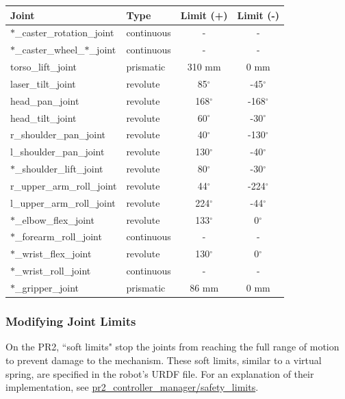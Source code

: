 \begin{tabular}{ll*{2}{c}}
Joint  & Type  & Limit (+) & Limit (-) \\
\hline \hline
$\ast$\_caster\_rotation\_joint        & continuous & -            & - \\
$\ast$\_caster\_wheel\_$\ast$\_joint   & continuous & -            & - \\
torso\_lift\_joint                     & prismatic  & 310 mm       & 0 mm \\
laser\_tilt\_joint                     & revolute   & 85$^\circ$   & -45$^\circ$ \\
head\_pan\_joint                       & revolute   & 168$^\circ$  & -168$^\circ$  \\
head\_tilt\_joint                      & revolute   & 60$^\circ$   & -30$^\circ$  \\
r\_shoulder\_pan\_joint                 & revolute   & 40$^\circ$   & -130$^\circ$  \\
l\_shoulder\_pan\_joint                 & revolute   & 130$^\circ$  & -40$^\circ$  \\
$\ast$\_shoulder\_lift\_joint          & revolute   & 80$^\circ$   & -30$^\circ$  \\
r\_upper\_arm\_roll\_joint              & revolute   & 44$^\circ$   & -224$^\circ$  \\
l\_upper\_arm\_roll\_joint              & revolute   & 224$^\circ$  & -44$^\circ$  \\
$\ast$\_elbow\_flex\_joint             & revolute   & 133$^\circ$  & 0$^\circ$  \\
$\ast$\_forearm\_roll\_joint           & continuous & -            & - \\
$\ast$\_wrist\_flex\_joint             & revolute   & 130$^\circ$  & 0$^\circ$  \\
$\ast$\_wrist\_roll\_joint             & continuous & -            & - \\
$\ast$\_gripper\_joint                 & prismatic  & 86 mm        & 0 mm \\
\end{tabular}

\subsubsection{Modifying Joint Limits}

On the PR2, ``soft limits" stop the joints from reaching the full range of
motion to prevent damage to the mechanism. These soft limits, similar to a
virtual spring, are specified in the robot's URDF file. For an explanation of
their implementation, see
\href{http://www.ros.org/wiki/pr2\_controller\_manager/safety\_limits}{pr2\_controller\_manager/safety\_limits}.

